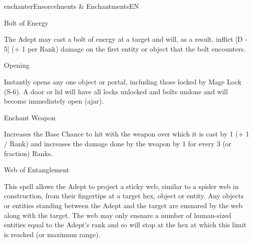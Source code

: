 \begin{College}[1.1]{enchanter}{Ensorcelments \& Enchantments}{EN}
\begin{spell}[S-2]{Bolt of Energy}

\begin{effects}
The Adept may cast a bolt of energy at a target and will, as a result,
inflict [D - 5] (+ 1 per Rank) damage on the first entity or object
that the bolt encounters.
\end{effects}
\end{spell}

\begin{spell}[S-3]{Opening}

\begin{effects}
Instantly opens any one object or portal, including those locked by
Mage Lock (S-6).  A door or lid will have all locks unlocked and bolts
undone and will become immediately open (ajar).
\end{effects}
\end{spell}

\begin{spell}[S-4]{Enchant Weapon}

\begin{effects}
Increases the Base Chance to hit with the weapon over which it is cast
by 1 (+ 1 / Rank) and increases the damage done by the weapon by 1 for
every 3 (or fraction) Ranks.
\end{effects}
\end{spell}

\begin{spell}[S-5]{Web of Entanglement}

\begin{effects}
This spell allows the Adept to project a sticky web, similar to a
spider web in construction, from their fingertips at a target hex,
object or entity.  Any objects or entities standing between the Adept
and the target are ensnared by the web along with the target. The web
may only ensnare a number of human-sized entities equal to the Adept’s
rank and so will stop at the hex at which this limit is reached (or
maximum range).


\end{effects}
\end{spell}
\end{College}
